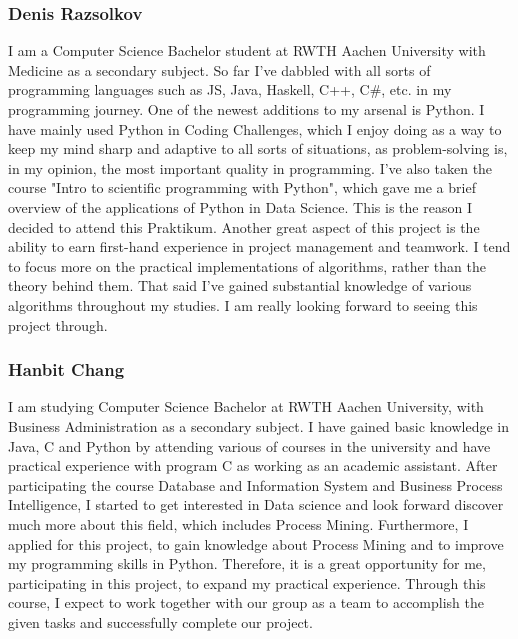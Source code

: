 \documentclass{article}
\begin{document}
\subsubsection{Denis Razsolkov}
I am a Computer Science Bachelor student at RWTH Aachen University with Medicine as a secondary subject. So far I've dabbled with all sorts of programming languages such as JS, Java, Haskell, C++, C\#, etc. in my programming journey. One of the newest additions to my arsenal is Python. I have mainly used Python in Coding Challenges, which I enjoy doing as a way to keep my mind sharp and adaptive to all sorts of situations, as problem-solving is, in my opinion, the most important quality in programming. I've also taken the course "Intro to scientific programming with Python", which gave me a brief overview of the applications of Python in Data Science. This is the reason I decided to attend this Praktikum. Another great aspect of this project is the ability to earn first-hand experience in project management and teamwork. I tend to focus more on the practical implementations of algorithms, rather than the theory behind them. That said I've gained substantial knowledge of various algorithms throughout my studies. I am really looking forward to seeing this project through.

\subsubsection{Hanbit Chang}
I am studying Computer Science Bachelor at RWTH Aachen University, with Business Administration as a secondary subject. I have gained basic knowledge in Java, C and Python by attending various of courses in the university and have practical experience with program C as working as an academic assistant. After participating the course Database and Information System and Business Process Intelligence, I started to get interested in Data science and look forward discover much more about this field, which includes Process Mining. Furthermore, I applied for this project, to gain knowledge about Process Mining and to improve my programming skills in Python. Therefore, it is a great opportunity for me, participating in this project, to expand my practical experience. Through this course, I expect to work together with our group as a team to accomplish the given tasks and successfully complete our project.
\end{document}
